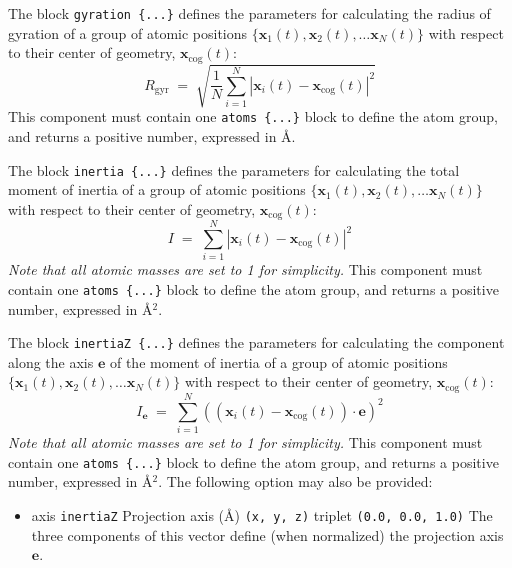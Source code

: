 The block \texttt{gyration~\{...\}} defines the
parameters for calculating the radius of gyration of a group of atomic
positions $\{ \mathbf{x}_1(t), \mathbf{x}_2(t), \ldots \mathbf{x}_N(t)
\}$ with respect to their center of geometry,
$\mathbf{x}_{\mathrm{cog}}(t)$:
\begin{equation}
  \label{eq:colvar_gyration}
  R_{\mathrm{gyr}} \; = \; \sqrt{ \frac{1}{N}
    \sum_{i=1}^{N} \left|\mathbf{x}_{i}(t) -
      \mathbf{x}_{\mathrm{cog}}(t)\right|^{2} }
\end{equation}
This component must contain one \texttt{atoms~\{...\}} block to
define the atom group, and returns a positive number, expressed in
\AA{}.


The block \texttt{inertia~\{...\}} defines the
parameters for calculating the total moment of inertia of a group of atomic
positions $\{ \mathbf{x}_1(t), \mathbf{x}_2(t), \ldots \mathbf{x}_N(t)
\}$ with respect to their center of geometry,
$\mathbf{x}_{\mathrm{cog}}(t)$:
\begin{equation}
  \label{eq:colvar_inertia}
  I \; = \; \sum_{i=1}^{N} \left|\mathbf{x}_{i}(t) -
      \mathbf{x}_{\mathrm{cog}}(t)\right|^{2}
\end{equation}
\emph{Note that all atomic masses are set to 1 for simplicity.}
This component must contain one \texttt{atoms~\{...\}} block to
define the atom group, and returns a positive number, expressed in
\AA{}$^{2}$.


The block \texttt{inertiaZ~\{...\}} defines the
parameters for calculating the component along the axis $\mathbf{e}$ of the moment of inertia of a group of atomic
positions $\{ \mathbf{x}_1(t), \mathbf{x}_2(t), \ldots \mathbf{x}_N(t)
\}$ with respect to their center of geometry,
$\mathbf{x}_{\mathrm{cog}}(t)$:
\begin{equation}
  \label{eq:colvar_inertia_z}
  I_{\mathbf{e}} \; = \; \sum_{i=1}^{N} \left(\left(\mathbf{x}_{i}(t) -
      \mathbf{x}_{\mathrm{cog}}(t)\right)\cdot\mathbf{e}\right)^{2}
\end{equation}
\emph{Note that all atomic masses are set to 1 for simplicity.}
This component must contain one \texttt{atoms~\{...\}} block to
define the atom group, and returns a positive number, expressed in
\AA{}$^{2}$.  The following option may also be provided:
\begin{itemize}
\item %
  \keydef
    {axis}{%
    \texttt{inertiaZ}}{%
    Projection axis (\AA{})}{%
    \texttt{(x, y, z)} triplet}{%
    \texttt{(0.0, 0.0, 1.0)}}{%
    The three components of this vector define (when normalized) the
    projection axis $\mathbf{e}$.}
\end{itemize}


